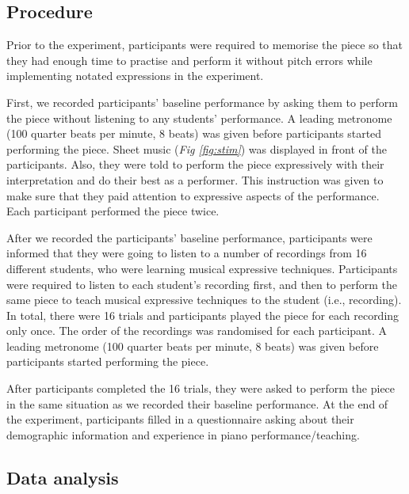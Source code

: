 \documentclass[
  man]{apa6}
\begin{document}
\hypertarget{procedure}{%
\subsection{Procedure}\label{procedure}}

Prior to the experiment, participants were required to memorise the piece so that they had enough time to practise and perform it without pitch errors while implementing notated expressions in the experiment.

First, we recorded participants' baseline performance by asking them to perform the piece without listening to any students' performance. A leading metronome (100 quarter beats per minute, 8 beats) was given before participants started performing the piece. Sheet music (\emph{Fig \ref{fig:stim}}) was displayed in front of the participants. Also, they were told to perform the piece expressively with their interpretation and do their best as a performer. This instruction was given to make sure that they paid attention to expressive aspects of the performance. Each participant performed the piece twice.

After we recorded the participants' baseline performance, participants were informed that they were going to listen to a number of recordings from 16 different students, who were learning musical expressive techniques. Participants were required to listen to each student's recording first, and then to perform the same piece to teach musical expressive techniques to the student (i.e., recording). In total, there were 16 trials and participants played the piece for each recording only once. The order of the recordings was randomised for each participant. A leading metronome (100 quarter beats per minute, 8 beats) was given before participants started performing the piece.

After participants completed the 16 trials, they were asked to perform the piece in the same situation as we recorded their baseline performance. At the end of the experiment, participants filled in a questionnaire asking about their demographic information and experience in piano performance/teaching.

\hypertarget{data-analysis}{%
\subsection{Data analysis}\label{data-analysis}}
\end{document}

